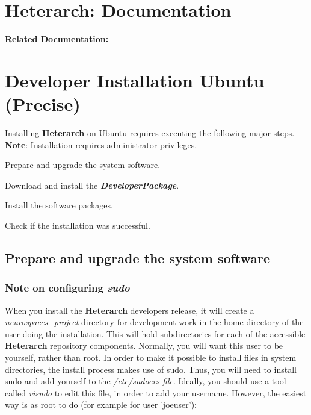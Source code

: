 \documentclass[12pt]{article}
\begin{document}
\section*{Heterarch: Documentation}

{\bf Related Documentation:} \\

\section*{Developer Installation Ubuntu (Precise)}

Installing {\bf\small Heterarch} on Ubuntu requires executing the following major steps. {\bf Note}: Installation requires administrator privileges.
\begin{description}
   \item Prepare and upgrade the system software.
   \item Download and install the {\bf{\emph{DeveloperPackage}}}.
   \item Install the software packages.
   \item Check if the installation was successful. 
\end{description}

\subsection*{Prepare and upgrade the system software}

\subsubsection*{Note on configuring {\emph{sudo}}}

When you install the {\bf\small Heterarch} developers release, it will create a
{\it neurospaces\_project} directory for development work in the home
directory of the user doing the installation.  This will hold
subdirectories for each of the accessible {\bf\small Heterarch} repository components.  Normally, you
will want this user to be yourself, rather than root.  In order to
make it possible to install files in system directories, the install
process makes use of sudo.  Thus, you will need to install sudo and
add yourself to the {\it /etc/sudoers file}.  Ideally, you should use
a tool called {\it visudo} to edit this file, in order to add your
username.  However, the easiest way is as root to do (for example for
user 'joeuser'):
\end{document}
